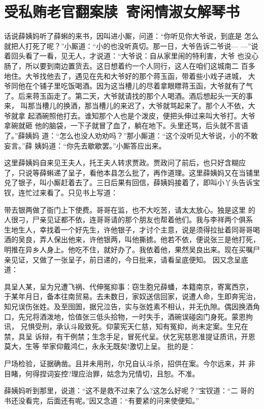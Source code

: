 \chapter{受私贿老官翻案牍~寄闲情淑女解琴书}

话说薛姨妈听了薛蝌的来书，因叫进小厮，问道：“你听见你大爷说，到底是
怎么就把人打死了呢？”小厮道：“小的也没听真切。那一日，大爷告诉二爷说—
—”说着回头看了一看，见无人，才说道：“大爷说：自从家里闹的特利害，大爷
也没心肠了，所以要到南边置货去。这日想着约一个人同行，这人在咱们这城南二
百多地住。大爷找他去了，遇见在先和大爷好的那个蒋玉函，带着些小戏子进城，
大爷同他在个铺子里吃饭喝酒。因为这当槽儿的尽着拿眼瞟蒋玉函，大爷就有了气
了。后来蒋玉函走了。第二天，大爷就请找的那个人喝酒。酒后想起头一天的事来，
叫那当槽儿的换酒，那当槽儿的来迟了，大爷就骂起来了。那个人不依，大爷就拿
起酒碗照他打去。谁知那个人也是个泼皮，便把头伸过来叫大爷打。大爷拿碗就砸
他的脑袋，一下子就冒了血了，躺在地下。头里还骂，后头就不言语了。”薛姨妈
道：“怎么也没人劝劝吗？”那小厮道：“这个没听见大爷说，小的不敢妄言。”薛
姨妈道：“你先去歇歇罢。”小厮答应出来。

这里薛姨妈自来见王夫人，托王夫人转求贾政。贾政问了前后，也只好含糊应
了，只说等薛蝌递了呈子，看他本县怎么批了，再作道理。这里薛姨妈又在当铺里
兑了银子，叫小厮赶着去了。三日后果有回信，薛姨妈接着了，即叫小丫头告诉宝
钗，连忙过来看了。只见书上写道：

带去银两做了衙门上下使费。哥哥在监，也不大吃苦，请太太放心。独是这里
的人很刁，尸亲见证都不依，连哥哥请的那个朋友也帮着他们。我与李祥两个俱系
生地生人，幸找着一个好先生，许他银子，才讨个主意，说是须得拉扯着同哥哥喝
酒的吴良，弄人保出他来，许他银两，叫他撕掳。他若不依，便说张三是他打死，
明推在异乡人身上。他吃不住，就好办了。我依着他，果然吴良出来。现在买嘱尸
亲见证，又做了一张呈子，前日递的，今日批来，请看呈底便知。
因又念呈底道：

具呈人某，呈为兄遭飞祸、代伸冤抑事：窃生胞兄薛蟠，本籍南京，寄寓西京，
于某年月日，备本往南贸易。去未数日，家奴送信回家，说遭人命，生即奔宪治，
知兄误伤张姓。及至囹圄，据兄泣告，实与张姓素不相认，并无仇隙。偶因换酒角
口，先兄将酒泼地，恰值张三低头拾物，一时失手，酒碗误碰囟门身死。蒙恩拘讯，
兄惧受刑，承认斗殴致死。仰蒙宪天仁慈，知有冤抑，尚未定案。生兄在禁，具呈
诉辩，有干例禁；生念手足，冒死代呈。伏乞宪慈恩准提证质讯，开恩莫大，生等
举家仰戴鸿仁，永永无既矣!激切上呈。
批的是：

尸场检验，证据确凿。且并未用刑，尔兄自认斗杀，招供在案。今尔远来，并
非目睹，何得捏词妄控?理应治罪，姑念为兄情切，且恕。不准。

薛姨妈听到那里，说道：“这不是救不过来了么?这怎么好呢？”宝钗道：“二
哥的书还没看完，后面还有呢。”因又念道：“有要紧的问来使便知。”

